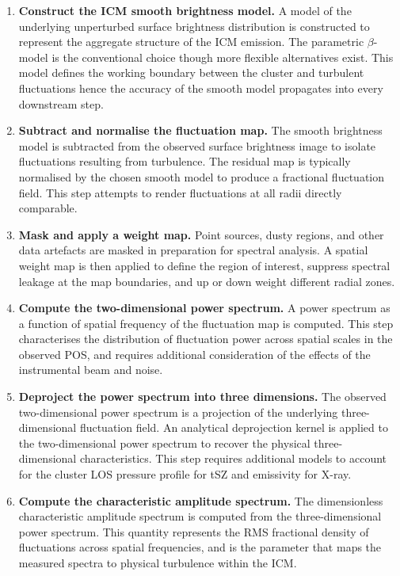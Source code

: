 \begin{enumerate}
	
	\item \textbf{Construct the ICM smooth brightness model.} A model of the underlying unperturbed surface brightness distribution is constructed to represent the aggregate structure of the ICM emission. The parametric $\beta$-model is the conventional choice though more flexible alternatives exist. This model defines the working boundary between the cluster and turbulent fluctuations hence the accuracy of the smooth model propagates into every downstream step.
	
	\item \textbf{Subtract and normalise the fluctuation map.} 
	The smooth brightness model is subtracted from the observed surface brightness image to isolate fluctuations resulting from turbulence. The residual map is typically normalised by the chosen smooth model to produce a fractional fluctuation field. This step attempts to render fluctuations at all radii directly comparable.
	
	\item \textbf{Mask and apply a weight map.} Point sources, dusty regions, and other data artefacts are masked in preparation for spectral analysis. A spatial weight map is then applied to define the region of interest, suppress spectral leakage at the map boundaries, and up or down weight different radial zones. 
	
	\item \textbf{Compute the two-dimensional power spectrum.} A power spectrum as a function of spatial frequency of the fluctuation map is computed. This step characterises the distribution of fluctuation power across spatial scales in the observed POS, and requires additional consideration of the effects of the instrumental beam and noise.
	
	\item \textbf{Deproject the power spectrum into three dimensions.} The observed two-dimensional power spectrum is a projection of the underlying three-dimensional fluctuation field. An analytical deprojection kernel is applied to the two-dimensional power spectrum to recover the physical three-dimensional characteristics. This step requires additional models to account for the cluster LOS pressure profile for tSZ and emissivity for X-ray.
	
	\item \textbf{Compute the characteristic amplitude spectrum.} The dimensionless characteristic amplitude spectrum is computed from the three-dimensional power spectrum. This quantity represents the RMS fractional density of fluctuations across spatial frequencies, and is the parameter that maps the measured spectra to physical turbulence within the ICM.
	

\end{enumerate}
